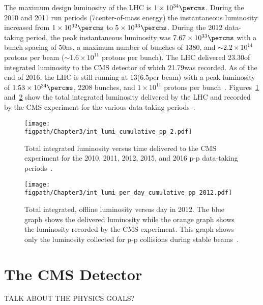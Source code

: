 The maximum design luminosity of the LHC is $1\times10^{34}\percms$.
During the 2010 and 2011 run periods (7\TeV center-of-mass energy) the instantaneous luminosity increased from $1\times10^{32}\percms$ to $5\times10^{33}\percms$.
During the 2012 data-taking period, the peak instantaneous luminosity was $7.67\times10^{33}\percms$ with a bunch spacing of 50\unit{ns}, a maximum number of bunches of 1380, and $\sim2.2\times10^{14}$ protons per beam ($\sim1.6\times10^{11}$ protons per bunch).
The LHC delivered 23.30\fbinv of integrated luminosity to the CMS detector of which 21.79\fbinv was recorded.
As of the end of 2016, the LHC is still running at 13\TeV (6.5\TeV per beam) with a peak luminosity of $1.53\times10^{34}\percms$, 2208 bunches, and $1\times10^{11}$ protons per bunch~\cite{CMSWebBasedMonitoring,LumiPublic}.
Figures~\ref{fig:LHC_int_lumi_pp} and~\ref{fig:LHC_lumi_per_day_pp} show the total integrated luminosity delivered by the LHC and recorded by the CMS experiment for the various data-taking periods~\cite{LumiPublic}.

\begin{figure}[!hbt]
    \centering
    \texttt{[image: \\figpath/Chapter3/int\_lumi\_cumulative\_pp\_2.pdf]}
    \caption{Total integrated luminosity versus time delivered to the CMS experiment for the 2010, 2011, 2012, 2015, and 2016 p-p data-taking periods~\cite{LumiPublic}.}
    \label{fig:LHC_int_lumi_pp}
\end{figure}

\begin{figure}[!hbt]
    \centering
    \texttt{[image: \\figpath/Chapter3/int\_lumi\_per\_day\_cumulative\_pp\_2012.pdf]}
    \caption{Total integrated, offline luminosity versus day in 2012. The blue graph shows the delivered luminosity while the orange graph shows the luminosity recorded by the CMS experiment. This graph shows only the luminosity collected for p-p collisions during stable beams~\cite{LumiPublic}.}
    \label{fig:LHC_lumi_per_day_pp}
\end{figure}


\section{The CMS Detector}

TALK ABOUT THE PHYSICS GOALS?

